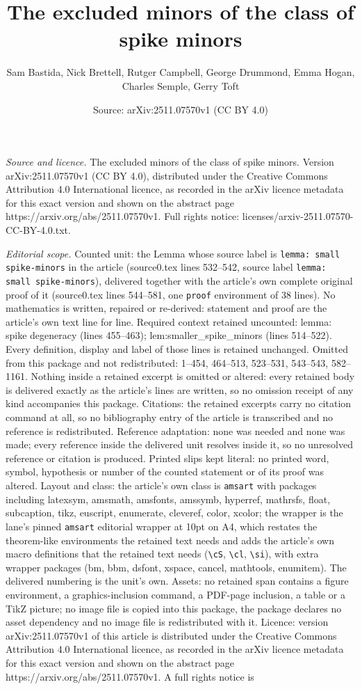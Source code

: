 \documentclass[10pt,a4paper]{amsart}
\title[The excluded minors of the class of spike minors]{The excluded minors of the class of spike minors}
\author{Sam Bastida, Nick Brettell, Rutger Campbell, George Drummond, Emma Hogan, Charles Semple, Gerry Toft}
\date{Source: arXiv:2511.07570v1 (CC BY 4.0)}
\begin{document}
\maketitle

\noindent\emph{Source and licence.} The excluded minors of the class of spike minors. Version arXiv:2511.07570v1 (CC BY 4.0), distributed under the Creative Commons Attribution 4.0 International licence, as recorded in the arXiv licence metadata for this exact version and shown on the abstract page https://arxiv.org/abs/2511.07570v1. Full rights notice: licenses/arxiv-2511.07570-CC-BY-4.0.txt.\par\smallskip

\noindent\textit{Editorial scope.} Counted unit: the Lemma whose source label is \texttt{lemma: small spike-minors} in the article (source0.tex lines 532--542, source label \texttt{lemma: small spike-minors}), delivered together with the article's own complete original proof of it (source0.tex lines 544--581, one \texttt{proof} environment of 38 lines). No mathematics is written, repaired or re-derived: statement and proof are the article's own text line for line. Required context retained uncounted: lemma: spike degeneracy (lines 455--463); lem:smaller\_spike\_minors (lines 514--522). Every definition, display and label of those lines is retained unchanged. Omitted from this package and not redistributed: 1--454, 464--513, 523--531, 543--543, 582--1161. Nothing inside a retained excerpt is omitted or altered: every retained body is delivered exactly as the article's lines are written, so no omission receipt of any kind accompanies this package. Citations: the retained excerpts carry no citation command at all, so no bibliography entry of the article is transcribed and no reference is redistributed. Reference adaptation: none was needed and none was made; every reference inside the delivered unit resolves inside it, so no unresolved reference or citation is produced. Printed slips kept literal: no printed word, symbol, hypothesis or number of the counted statement or of its proof was altered. Layout and class: the article's own class is \texttt{amsart} with packages including latexsym, amsmath, amsfonts, amssymb, hyperref, mathrsfs, float, subcaption, tikz, euscript, enumerate, cleveref, color, xcolor; the wrapper is the lane's pinned \texttt{amsart} editorial wrapper at 10pt on A4, which restates the theorem-like environments the retained text needs and adds the article's own macro definitions that the retained text needs (\texttt{\textbackslash cS}, \texttt{\textbackslash cl}, \texttt{\textbackslash si}), with extra wrapper packages (bm, bbm, dsfont, xspace, cancel, mathtools, enumitem). The delivered numbering is the unit's own. Assets: no retained span contains a figure environment, a graphics-inclusion command, a PDF-page inclusion, a table or a TikZ picture; no image file is copied into this package, the package declares no asset dependency and no image file is redistributed with it. Licence: version arXiv:2511.07570v1 of this article is distributed under the Creative Commons Attribution 4.0 International licence, as recorded in the arXiv licence metadata for this exact version and shown on the abstract page https://arxiv.org/abs/2511.07570v1. A full rights notice is 
\end{document}
